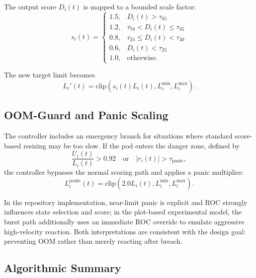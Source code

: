 \documentclass[12pt,a4paper]{article}
\begin{document}
The output score $D_i(t)$ is mapped to a bounded scale factor:
\begin{equation}
\label{eq:scalefactor}
s_i(t)=
\begin{cases}
1.5, & D_i(t) > \tau_{85} \\
1.2, & \tau_{70} < D_i(t) \leq \tau_{85} \\
0.8, & \tau_{25} \leq D_i(t) < \tau_{40} \\
0.6, & D_i(t) < \tau_{25} \\
1.0, & \text{otherwise.}
\end{cases}
\end{equation}

The new target limit becomes
\begin{equation}
\label{eq:newlimit}
L_i'(t) = \text{clip}(s_i(t)L_i(t),L_i^{\min},L_i^{\max}).
\end{equation}

\subsection{OOM-Guard and Panic Scaling}

The controller includes an emergency branch for situations where standard score-based resizing may be too slow. If the pod enters the danger zone, defined by
\begin{equation}
\label{eq:panic}
\frac{U_i(t)}{L_i(t)} > 0.92
\quad \text{or} \quad
|r_i(t)| > \tau_{\text{panic}},
\end{equation}
the controller bypasses the normal scoring path and applies a panic multiplier:
\begin{equation}
\label{eq:paniclimit}
L_i^{\text{panic}}(t) = \text{clip}(2.0L_i(t),L_i^{\min},L_i^{\max}).
\end{equation}

In the repository implementation, near-limit panic is explicit and ROC strongly influences state selection and score; in the plot-based experimental model, the burst path additionally uses an immediate ROC override to emulate aggressive high-velocity reaction. Both interpretations are consistent with the design goal: preventing OOM rather than merely reacting after breach.

\subsection{Algorithmic Summary}
\end{document}
